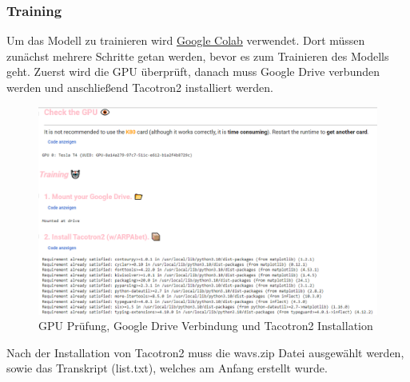 \subsubsection*{Training}
Um das Modell zu trainieren wird \href{https://colab.research.google.com/github/justinjohn0306/FakeYou-Tacotron2-Notebook/blob/dev/FakeYou_Tacotron_2_Training.ipynb}{Google Colab} verwendet. Dort müssen zunächst mehrere Schritte getan werden, bevor es zum Trainieren des Modells geht. Zuerst wird die GPU überprüft, danach muss Google Drive verbunden werden und anschließend Tacotron2 installiert werden.
\begin{figure}[H]
    \includegraphics[width=1.0\textwidth]{Bilder/AudioTraining1}
    \centering
    \caption{GPU Prüfung, Google Drive Verbindung und Tacotron2 Installation}
    \label{fig:TrainingPart1}
\end{figure}
Nach der Installation von Tacotron2 muss die wavs.zip Datei ausgewählt werden, sowie das Transkript (list.txt), welches am Anfang erstellt wurde.
